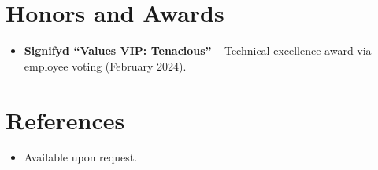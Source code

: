 \documentclass[11pt,a4paper,sans]{moderncv}
\begin{document}

\section{Honors and Awards}
\vspace{1pt}
\begin{itemize}
\item{\textbf{Signifyd ``Values VIP: Tenacious''} -- Technical excellence award via employee voting (February 2024).}
\end{itemize}


\section{References}
\vspace{1pt}
\begin{itemize}
\item{Available upon request.}
\end{itemize}
\end{document}
